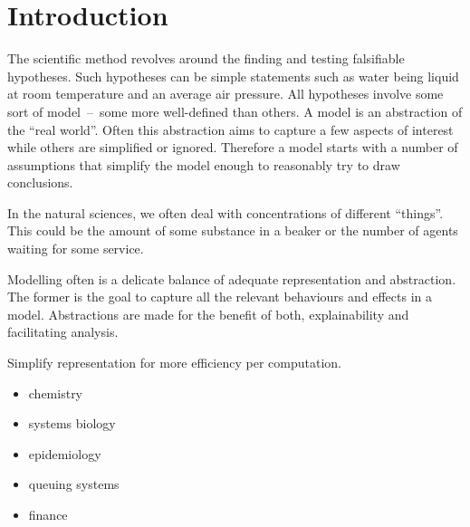 \chapter{Introduction}


The scientific method revolves around the finding and testing falsifiable hypotheses.
Such hypotheses can be simple statements such as water being liquid at room temperature and an average air pressure.
All hypotheses involve some sort of model~--~some more well-defined than others.
A model is an abstraction of the ``real world''.
Often this abstraction aims to capture a few aspects of interest while others are simplified or ignored.
Therefore a model starts with a number of assumptions that simplify the model enough to reasonably try to draw conclusions.


In the natural sciences, we often deal with concentrations of different ``things''.
This could be the amount of some substance in a beaker or the number of agents waiting for some service.



Modelling often is a delicate balance of adequate representation and abstraction.
The former is the goal to capture all the relevant behaviours and effects in a model.
Abstractions are made for the benefit of both, explainability and facilitating analysis.

Simplify representation for more efficiency per computation.


\begin{itemize}
    \item chemistry~\parencite{gillespie1977exact}
    \item systems biology~\parencite{wilkinson2018stochastic,BuchWolkenhauer}
    \item epidemiology~\parencite{mode2000stochastic}
    \item queuing systems~\parencite{breuer2003markov} 
    \item finance~\parencite{pardoux2008markov}
\end{itemize}



